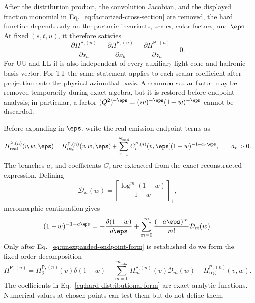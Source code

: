 After the distribution product, the convolution Jacobian, and the displayed
fraction monomial in Eq.~\eqref{eq:factorized-cross-section} are removed, the
hard function depends only on the partonic invariants, scales, color factors,
and $\eps$.  At fixed $(s,t,u)$, it therefore satisfies
\begin{equation}
 \frac{\partial H^{\mathsf P,(n)}}{\partial x_a}
 =\frac{\partial H^{\mathsf P,(n)}}{\partial x_b}
 =\frac{\partial H^{\mathsf P,(n)}}{\partial z_h}=0.
 \label{eq:fraction-independence}
\end{equation}
For UU and LL it is also independent of every auxiliary light-cone and
hadronic basis vector.  For TT the same statement applies to each scalar
coefficient after projection onto the physical azimuthal basis.  A common
scalar factor may be removed temporarily during exact algebra, but it is
restored before endpoint analysis; in particular, a factor
$(Q^2)^{-\eps}=(sv)^{-\eps}(1-w)^{-\eps}$ cannot be discarded.

Before expanding in $\eps$, write the real-emission endpoint terms as
\begin{equation}
 H_{\mathrm{real}}^{\mathsf P,(n)}(v,w,\eps)
 =H_{\mathrm{reg}}^{\mathsf P,(n)}(v,w,\eps)
 +\sum_{r=1}^{N_{\mathrm{end}}}
 C_r^{\mathsf P,(n)}(v,\eps)(1-w)^{-1-a_r\eps},
 \qquad a_r>0.
 \label{eq:unexpanded-endpoint-form}
\end{equation}
The branches $a_r$ and coefficients $C_r$ are extracted from the exact
reconstructed expression.  Defining
\begin{equation}
 \mathcal D_m(w)=\left[\frac{\log^m(1-w)}{1-w}\right]_+,
 \label{eq:plus-distributions}
\end{equation}
meromorphic continuation gives
\begin{equation}
 (1-w)^{-1-a\eps}
 =-\frac{\delta(1-w)}{a\eps}
 +\sum_{m=0}^{\infty}\frac{(-a\eps)^m}{m!}\mathcal D_m(w).
 \label{eq:endpoint-distribution-identity}
\end{equation}
Only after Eq.~\eqref{eq:unexpanded-endpoint-form} is established do we form
the fixed-order decomposition
\begin{equation}
 H^{\mathsf P,(n)}
 =H_\delta^{\mathsf P,(n)}(v)\delta(1-w)
 +\sum_{m=0}^{m_{\max}}H_m^{\mathsf P,(n)}(v)\mathcal D_m(w)
 +H_{\mathrm{reg}}^{\mathsf P,(n)}(v,w).
 \label{eq:hard-distributional-form}
\end{equation}
The coefficients in Eq.~\eqref{eq:hard-distributional-form} are exact
analytic functions.  Numerical values at chosen points can test them but do
not define them.
